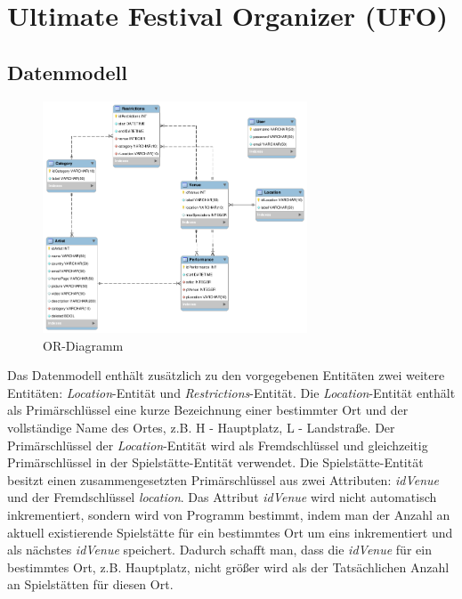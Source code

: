 \documentclass[12pt, a4paper]{article}
\author{Rotaru Daniel}
\begin{document}
\section{Ultimate Festival Organizer (UFO)}

\subsection{Datenmodell}

\begin{figure}[h] 	
	\centering
		\includegraphics[width=0.7\textwidth]{DbDiagramm.png}
	\caption{OR-Diagramm}
\end{figure}

Das Datenmodell enthält zusätzlich zu den vorgegebenen Entitäten zwei weitere Entitäten: \textit{Location}-Entität und \textit{Restrictions}-Entität. Die \textit{Location}-Entität enthält als Primärschlüssel eine kurze Bezeichnung einer bestimmter Ort und der vollständige Name des Ortes, z.B. H - Hauptplatz, L - Landstraße. Der Primärschlüssel der \textit{Location}-Entität wird als Fremdschlüssel und gleichzeitig Primärschlüssel in der Spielstätte-Entität verwendet. Die Spielstätte-Entität besitzt einen zusammengesetzten Primärschlüssel aus zwei Attributen: \textit{idVenue} und der Fremdschlüssel \textit{location}. Das Attribut \textit{idVenue} wird nicht automatisch inkrementiert, sondern wird von Programm bestimmt, indem man der Anzahl an aktuell existierende Spielstätte für ein bestimmtes Ort um eins inkrementiert und als nächstes \textit{idVenue} speichert. Dadurch schafft man, dass die \textit{idVenue} für ein bestimmtes Ort, z.B. Hauptplatz, nicht größer wird als der Tatsächlichen Anzahl an Spielstätten für diesen Ort.
\end{document}
